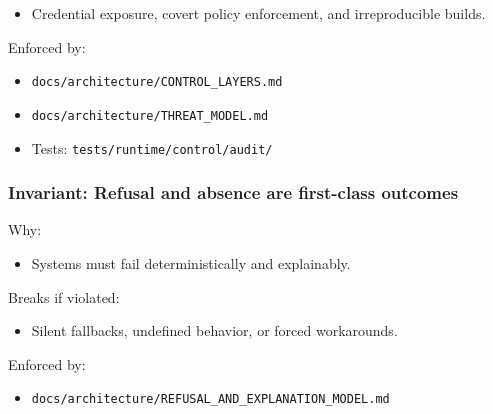 \documentclass[9pt,a4paper,openany]{book}
\begin{document}
\begin{itemize}
\item Credential exposure, covert policy enforcement, and irreproducible builds.\allowbreak{}
\end{itemize}


Enforced by:



\begin{itemize}
\item \texttt{docs/\allowbreak{}architecture/\allowbreak{}CONTROL\_\allowbreak{}LAYERS.\allowbreak{}md}
\end{itemize}


\begin{itemize}
\item \texttt{docs/\allowbreak{}architecture/\allowbreak{}THREAT\_\allowbreak{}MODEL.\allowbreak{}md}
\end{itemize}


\begin{itemize}
\item Tests: \texttt{tests/\allowbreak{}runtime/\allowbreak{}control/\allowbreak{}audit/\allowbreak{}}
\end{itemize}





\subsubsection{Invariant: Refusal and absence are first-class outcomes}


Why:



\begin{itemize}
\item Systems must fail deterministically and explainably.\allowbreak{}
\end{itemize}


Breaks if violated:



\begin{itemize}
\item Silent fallbacks, undefined behavior, or forced workarounds.\allowbreak{}
\end{itemize}


Enforced by:



\begin{itemize}
\item \texttt{docs/\allowbreak{}architecture/\allowbreak{}REFUSAL\_\allowbreak{}AND\_\allowbreak{}EXPLANATION\_\allowbreak{}MODEL.\allowbreak{}md}
\end{itemize}
\end{document}
